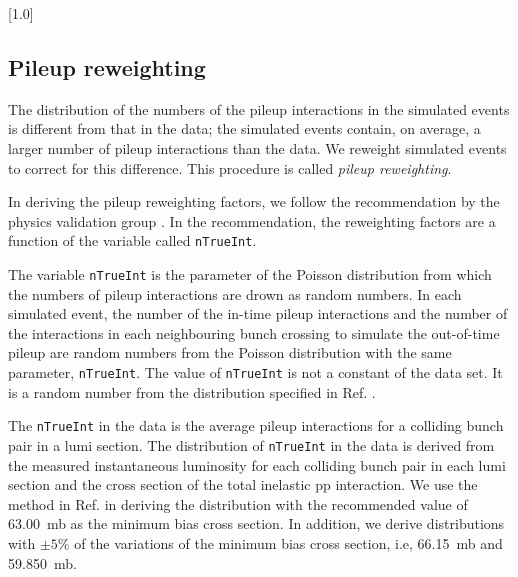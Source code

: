 \begin{table}[!h]
  \centering
  \tiny
  \scalebox{.7}[1.0]{}
  \label{tab:datasets_bkg}
\end{table}


\clearpage

\subsection{Pileup reweighting}
\label{sec:pileup-reweighting}

The distribution of the numbers of the pileup interactions in the
simulated events is different from that in the data; the simulated
events contain, on average, a larger number of pileup interactions than
the data. We reweight simulated events to correct for this difference.
This procedure is called \textit{pileup reweighting}.

In deriving the pileup reweighting factors, we follow the
recommendation by the physics validation group
\cite{twiki-PdmVPileUpDescription, twiki-PileupJSONFileforData}. In
the recommendation, the reweighting factors are a function of the
variable called \verb!nTrueInt!.

The variable \verb!nTrueInt! is the parameter of the Poisson
distribution from which the numbers of pileup interactions are drown
as random numbers. In each simulated event, the number of the in-time
pileup interactions and the number of the interactions in each
neighbouring bunch crossing to simulate the out-of-time pileup are
random numbers from the Poisson distribution with the same parameter,
\verb!nTrueInt!. The value of \verb!nTrueInt! is not a constant of the
data set. It is a random number from the distribution specified in
Ref. \cite{github-mix_2016_25ns_SpringMC_PUScenarioV1_PoissonOOTPU_cfi}.

The \verb!nTrueInt! in the data is the average pileup interactions for
a colliding bunch pair in a lumi section. The distribution of
\verb!nTrueInt! in the data is derived from the measured instantaneous
luminosity for each colliding bunch pair in each lumi section and the
cross section of the total inelastic pp interaction. We use the method
in Ref. \cite{twiki-PileupJSONFileforData} in deriving the
distribution with the recommended value of 63.00~mb as the minimum
bias cross section. In addition, we derive distributions with $\pm
5\%$ of the variations of the minimum bias cross section, i.e,
66.15~mb and 59.850~mb.


